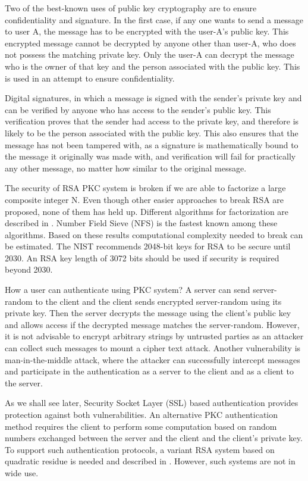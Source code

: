 \begin{multicols}{2}
Two of the best-known uses of public key cryptography are to ensure confidentiality and signature. In the first case, if any one wants to send a message to user A, the message has to be encrypted with the user-A's public key. This encrypted message cannot be decrypted by anyone other than user-A, who does not possess the matching private key. Only the user-A can decrypt the message who is the owner of that key and the person associated with the public key. This is used in an attempt to ensure confidentiality.

Digital signatures, in which a message is signed with the sender's private key and can be verified by anyone who has access to the sender's public key. This verification proves that the sender had access to the private key, and therefore is likely to be the person associated with the public key. This also ensures that the message has not been tampered with, as a signature is mathematically bound to the message it originally was made with, and verification will fail for practically any other message, no matter how similar to the original message.

The security of RSA PKC system is broken if we are able to factorize a large composite integer N. Even though other easier approaches to break RSA are proposed, none of them has held up. Different algorithms for factorization are described in \cite{chap2-key1}. Number Field Sieve (NFS) is the fastest known among these algorithms. Based on these results computational complexity needed to break can be estimated. The NIST recommends 2048-bit keys for RSA to be secure until 2030. An RSA key length of 3072 bits should be used if security is required beyond 2030. 

How a user can authenticate using PKC system? A server can send server-random to the client and the client sends encrypted server-random using its private key. Then the server decrypts the message using the client's public key and allows access if the decrypted message matches the server-random. However, it is not advisable to encrypt arbitrary strings by untrusted parties as an attacker can collect such messages to mount a cipher text attack. Another vulnerability is man-in-the-middle attack, where the attacker can successfully intercept messages and participate in the authentication as a server to the client and as a client to the server.

As we shall see later, Security Socket Layer (SSL) based authentication provides protection against both vulnerabilities. An alternative PKC authentication method requires the client to perform some computation based on random numbers exchanged between the server and the client and the client's private key. To support such authentication protocols, a variant RSA system based on quadratic residue is needed and described in \cite{chap2-key1}. However, such systems are not in wide use. 


\end{multicols}
